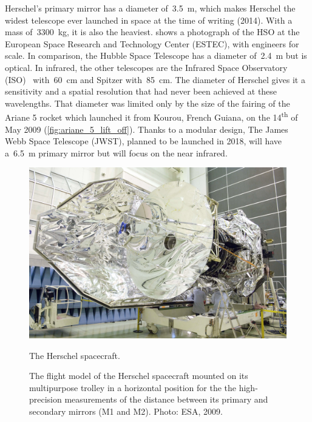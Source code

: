 Herschel's primary mirror has a diameter of~\SI{3.5}{\meter}, which makes Herschel the widest telescope ever launched in space at the time of writing (2014).
With a mass of~\SI{3300}{\kilo\gram}, it is also the heaviest.
 shows a photograph of the HSO at the European Space Research and Technology Center (ESTEC), with engineers for scale.
In comparison, the Hubble Space Telescope has a diameter of~\SI{2.4}{\meter} but is optical.
In infrared, the other telescopes are the Infrared Space Observatory (ISO)~\cite{isoHandbook1} with~\SI{60}{\centi\meter} and Spitzer with~\SI{85}{\centi\meter}.
The diameter of Herschel gives it a sensitivity and a spatial resolution that had never been achieved at these wavelengths.
That diameter was limited only by the size of the fairing of the Ariane 5 rocket which launched it from Kourou, French Guiana, on the 14\textsuperscript{th} of May 2009 (\cref{fig:ariane_5_lift_off}).
Thanks to a modular design, The James Webb Space Telescope (JWST), planned to be launched in 2018, will have a~\SI{6.5}{\meter} primary mirror but will focus on the near infrared.

\begin{figure}[hbtp]
    \centering
    \includegraphics[width=.8\textwidth]{herschel_spacecraft}
    \caption{The Herschel spacecraft.}
    \caption*{The flight model of the Herschel spacecraft mounted on its multipurpose trolley in a horizontal position for the the high-precision measurements of the distance between its primary and secondary mirrors (M1 and M2).  Photo: ESA, 2009.}
    \label{fig:photo_herschel}
\end{figure}

